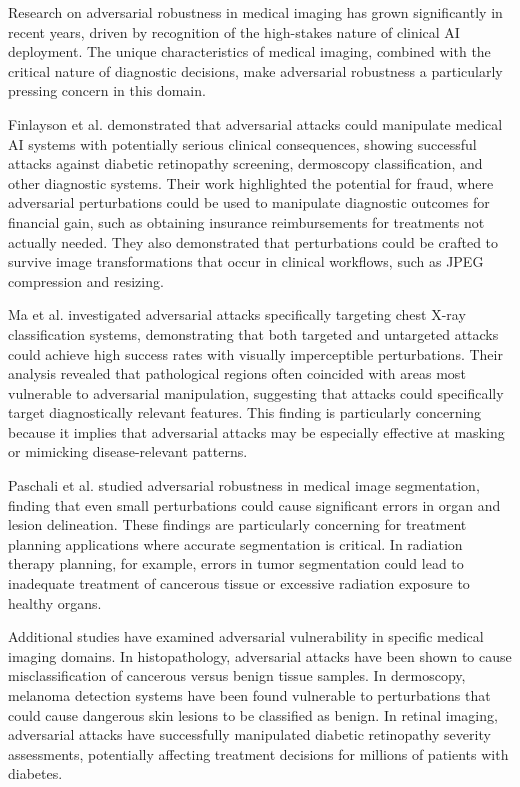 \documentclass[12pt,a4paper]{article}
\begin{document}
Research on adversarial robustness in medical imaging has grown significantly in recent years, driven by recognition of the high-stakes nature of clinical AI deployment. The unique characteristics of medical imaging, combined with the critical nature of diagnostic decisions, make adversarial robustness a particularly pressing concern in this domain.

Finlayson et al. \cite{finlayson2019} demonstrated that adversarial attacks could manipulate medical AI systems with potentially serious clinical consequences, showing successful attacks against diabetic retinopathy screening, dermoscopy classification, and other diagnostic systems. Their work highlighted the potential for fraud, where adversarial perturbations could be used to manipulate diagnostic outcomes for financial gain, such as obtaining insurance reimbursements for treatments not actually needed. They also demonstrated that perturbations could be crafted to survive image transformations that occur in clinical workflows, such as JPEG compression and resizing.

Ma et al. \cite{ma2021} investigated adversarial attacks specifically targeting chest X-ray classification systems, demonstrating that both targeted and untargeted attacks could achieve high success rates with visually imperceptible perturbations. Their analysis revealed that pathological regions often coincided with areas most vulnerable to adversarial manipulation, suggesting that attacks could specifically target diagnostically relevant features. This finding is particularly concerning because it implies that adversarial attacks may be especially effective at masking or mimicking disease-relevant patterns.

Paschali et al. \cite{paschali2018} studied adversarial robustness in medical image segmentation, finding that even small perturbations could cause significant errors in organ and lesion delineation. These findings are particularly concerning for treatment planning applications where accurate segmentation is critical. In radiation therapy planning, for example, errors in tumor segmentation could lead to inadequate treatment of cancerous tissue or excessive radiation exposure to healthy organs.

Additional studies have examined adversarial vulnerability in specific medical imaging domains. In histopathology, adversarial attacks have been shown to cause misclassification of cancerous versus benign tissue samples. In dermoscopy, melanoma detection systems have been found vulnerable to perturbations that could cause dangerous skin lesions to be classified as benign. In retinal imaging, adversarial attacks have successfully manipulated diabetic retinopathy severity assessments, potentially affecting treatment decisions for millions of patients with diabetes.
\end{document}

